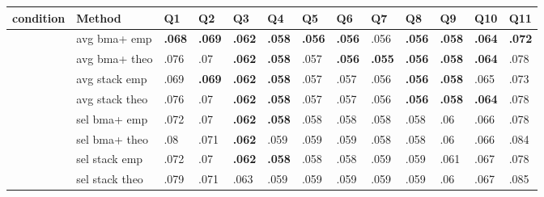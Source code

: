 \documentclass[border={-20pt 28pt 20pt -20pt}]{standalone}
\begin{document}
                   \pagecolor{Mycolor2}
                   \renewcommand{\arraystretch}{1.1} 
\centering\begingroup\fontsize{9}{11}\selectfont

\begin{tabular}{>{\centering\arraybackslash}p{4.4em}>{\centering\arraybackslash}p{7em}>{\centering\arraybackslash}p{1.8em}>{\centering\arraybackslash}p{1.8em}>{\centering\arraybackslash}p{1.8em}>{\centering\arraybackslash}p{1.8em}>{\centering\arraybackslash}p{1.8em}>{\centering\arraybackslash}p{1.8em}>{\centering\arraybackslash}p{1.8em}>{\centering\arraybackslash}p{1.8em}>{\centering\arraybackslash}p{1.8em}>{\centering\arraybackslash}p{1.8em}>{\centering\arraybackslash}p{1.8em}}
\toprule
\textbf{condition} & \textbf{Method} & \textbf{Q1} & \textbf{Q2} & \textbf{Q3} & \textbf{Q4} & \textbf{Q5} & \textbf{Q6} & \textbf{Q7} & \textbf{Q8} & \textbf{Q9} & \textbf{Q10} & \textbf{Q11}\\
\midrule
 & avg bma+ emp & \textbf{.068} & \textbf{.069} & \textbf{.062} & \textbf{.058} & \textbf{.056} & \textbf{.056} & .056 & \textbf{.056} & \textbf{.058} & \textbf{.064} & \textbf{.072}\\

 & avg bma+ theo & .076 & .07 & \textbf{.062} & \textbf{.058} & .057 & \textbf{.056} & \textbf{.055} & \textbf{.056} & \textbf{.058} & \textbf{.064} & .078\\

 & avg stack emp & .069 & \textbf{.069} & \textbf{.062} & \textbf{.058} & .057 & .057 & .056 & \textbf{.056} & \textbf{.058} & .065 & .073\\

 & avg stack theo & .076 & .07 & \textbf{.062} & \textbf{.058} & .057 & .057 & .056 & \textbf{.056} & \textbf{.058} & \textbf{.064} & .078\\

 & sel bma+ emp & .072 & .07 & \textbf{.062} & \textbf{.058} & .058 & .058 & .058 & .058 & .06 & .066 & .078\\

 & sel bma+ theo & .08 & .071 & \textbf{.062} & .059 & .059 & .059 & .058 & .058 & .06 & .066 & .084\\

 & sel stack emp & .072 & .07 & \textbf{.062} & \textbf{.058} & .058 & .058 & .059 & .059 & .061 & .067 & .078\\

 & sel stack theo & .079 & .071 & .063 & .059 & .059 & .059 & .059 & .059 & .06 & .067 & .085\\


\end{tabular}
\end{document}
